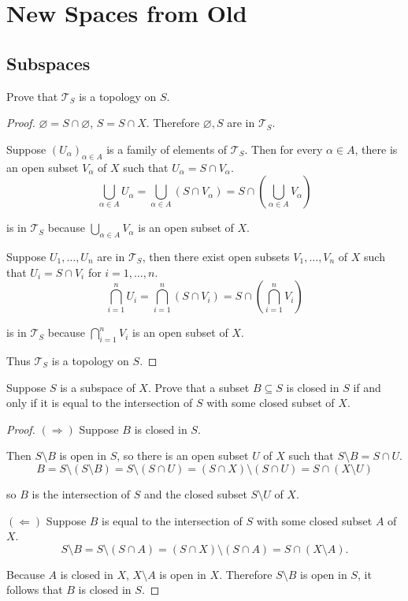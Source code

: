 \chapter{New Spaces from Old}

\section*{Subspaces}

\begin{exercise}{3.1}
	Prove that $\mathscr{T}_{S}$ is a topology on $S$.
\end{exercise}

\begin{proof}
	$\varnothing = S\cap\varnothing$, $S = S\cap X$. Therefore $\varnothing, S$ are in $\mathscr{T}_{S}$.

	Suppose ${(U_{\alpha})}_{\alpha\in A}$ is a family of elements of $\mathscr{T}_{S}$. Then for every $\alpha\in A$, there is an open subset $V_{\alpha}$ of $X$ such that $U_{\alpha} = S\cap V_{\alpha}$.
	\[
		\bigcup_{\alpha\in A}U_{\alpha} = \bigcup_{\alpha\in A}(S\cap V_{\alpha}) = S\cap \left(\bigcup_{\alpha\in A}V_{\alpha}\right)
	\]

	is in $\mathscr{T}_{S}$ because $\bigcup_{\alpha\in A}V_{\alpha}$ is an open subset of $X$.

	Suppose $U_{1}, \ldots, U_{n}$ are in $\mathscr{T}_{S}$, then there exist open subsets $V_{1}, \ldots, V_{n}$ of $X$ such that $U_{i} = S\cap V_{i}$ for $i = 1,\ldots, n$.
	\[
		\bigcap^{n}_{i=1}U_{i} = \bigcap^{n}_{i=1}(S\cap V_{i}) = S\cap \left(\bigcap^{n}_{i=1}V_{i}\right)
	\]

	is in $\mathscr{T}_{S}$ because $\bigcap^{n}_{i=1}V_{i}$ is an open subset of $X$.

	Thus $\mathscr{T}_{S}$ is a topology on $S$.
\end{proof}

\begin{exercise}{3.2}\label{exercise:3.2}
	Suppose $S$ is a subspace of $X$. Prove that a subset $B\subseteq S$ is closed in $S$ if and only if it is equal to the intersection of $S$ with some closed subset of $X$.
\end{exercise}

\begin{proof}
	$(\Rightarrow)$ Suppose $B$ is closed in $S$.

	Then $S\setminus B$ is open in $S$, so there is an open subset $U$ of $X$ such that $S\setminus B = S\cap U$.
	\[
		B = S\setminus (S\setminus B) = S\setminus (S\cap U) = (S\cap X)\setminus (S\cap U) = S\cap (X\setminus U)
	\]

	so $B$ is the intersection of $S$ and the closed subset $S\setminus U$ of $X$.

	$(\Leftarrow)$ Suppose $B$ is equal to the intersection of $S$ with some closed subset $A$ of $X$.
	\[
		S\setminus B = S\setminus (S\cap A) = (S\cap X) \setminus (S\cap A) = S\cap (X\setminus A).
	\]

	Because $A$ is closed in $X$, $X\setminus A$ is open in $X$. Therefore $S\setminus B$ is open in $S$, it follows that $B$ is closed in $S$.
\end{proof}

